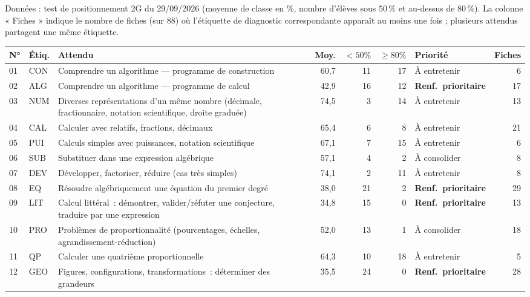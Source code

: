 Données : test de positionnement 2G du 29/09/2026 (moyenne de classe en \%, nombre d'élèves sous $50\,\%$ et au-dessus de $80\,\%$). La colonne « Fiches » indique le nombre de fiches (sur $88$) où l'étiquette de diagnostic correspondante apparaît au moins une fois ; plusieurs attendus partagent une même étiquette.\par\smallskip
{\footnotesize{}\begin{tabular}{@{}l l p{7.2cm} r r r l r@{}}\toprule
N° & Étiq. & Attendu & Moy. & $<50\%$ & $\geqslant80\%$ & Priorité & Fiches \\ \midrule
01 & CON & Comprendre un algorithme — programme de construction & 60{,}7 & 11 & 17 & À entretenir & 6 \\
02 & ALG & Comprendre un algorithme — programme de calcul & 42{,}9 & 16 & 12 & \textbf{Renf.\ prioritaire} & 17 \\
03 & NUM & Diverses représentations d'un même nombre (décimale, fractionnaire, notation scientifique, droite graduée) & 74{,}5 & 3 & 14 & À entretenir & 13 \\
04 & CAL & Calculer avec relatifs, fractions, décimaux & 65{,}4 & 6 & 8 & À entretenir & 21 \\
05 & PUI & Calculs simples avec puissances, notation scientifique & 67{,}1 & 7 & 15 & À entretenir & 6 \\
06 & SUB & Substituer dans une expression algébrique & 57{,}1 & 4 & 2 & À consolider & 8 \\
07 & DEV & Développer, factoriser, réduire (cas très simples) & 74{,}1 & 2 & 11 & À entretenir & 8 \\
08 & EQ & Résoudre algébriquement une équation du premier degré & 38{,}0 & 21 & 2 & \textbf{Renf.\ prioritaire} & 29 \\
09 & LIT & Calcul littéral~: démontrer, valider/réfuter une conjecture, traduire par une expression & 34{,}8 & 15 & 0 & \textbf{Renf.\ prioritaire} & 13 \\
10 & PRO & Problèmes de proportionnalité (pourcentages, échelles, agrandissement-réduction) & 52{,}0 & 13 & 1 & À consolider & 18 \\
11 & QP & Calculer une quatrième proportionnelle & 64{,}3 & 10 & 18 & À entretenir & 5 \\
12 & GEO & Figures, configurations, transformations~: déterminer des grandeurs & 35{,}5 & 24 & 0 & \textbf{Renf.\ prioritaire} & 28 \\

\end{tabular}}
